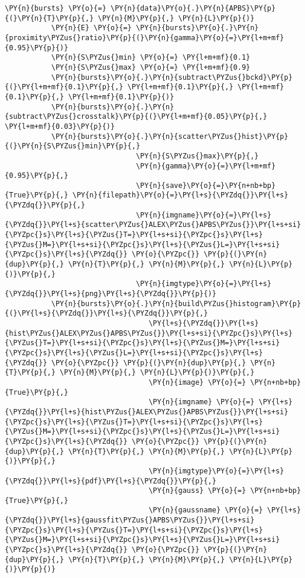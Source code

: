 \begin{Verbatim}[commandchars=\\\{\}, fontsize=\scriptsize]
           \PY{n}{bursts} \PY{o}{=} \PY{n}{data}\PY{o}{.}\PY{n}{APBS}\PY{p}{(}\PY{n}{T}\PY{p}{,} \PY{n}{M}\PY{p}{,} \PY{n}{L}\PY{p}{)}
           \PY{n}{E} \PY{o}{=} \PY{n}{bursts}\PY{o}{.}\PY{n}{proximity\PYZus{}ratio}\PY{p}{(}\PY{n}{gamma}\PY{o}{=}\PY{l+m+mf}{0.95}\PY{p}{)}
           \PY{n}{S\PYZus{}min} \PY{o}{=} \PY{l+m+mf}{0.1}
           \PY{n}{S\PYZus{}max} \PY{o}{=} \PY{l+m+mf}{0.9}
           \PY{n}{bursts}\PY{o}{.}\PY{n}{subtract\PYZus{}bckd}\PY{p}{(}\PY{l+m+mf}{0.1}\PY{p}{,} \PY{l+m+mf}{0.1}\PY{p}{,} \PY{l+m+mf}{0.1}\PY{p}{,} \PY{l+m+mf}{0.1}\PY{p}{)}
           \PY{n}{bursts}\PY{o}{.}\PY{n}{subtract\PYZus{}crosstalk}\PY{p}{(}\PY{l+m+mf}{0.05}\PY{p}{,} \PY{l+m+mf}{0.03}\PY{p}{)}
           \PY{n}{bursts}\PY{o}{.}\PY{n}{scatter\PYZus{}hist}\PY{p}{(}\PY{n}{S\PYZus{}min}\PY{p}{,} 
                               \PY{n}{S\PYZus{}max}\PY{p}{,} 
                               \PY{n}{gamma}\PY{o}{=}\PY{l+m+mf}{0.95}\PY{p}{,} 
                               \PY{n}{save}\PY{o}{=}\PY{n+nb+bp}{True}\PY{p}{,} \PY{n}{filepath}\PY{o}{=}\PY{l+s}{\PYZdq{}}\PY{l+s}{\PYZdq{}}\PY{p}{,} 
                               \PY{n}{imgname}\PY{o}{=}\PY{l+s}{\PYZdq{}}\PY{l+s}{scatter\PYZus{}ALEX\PYZus{}APBS\PYZus{}}\PY{l+s+si}{\PYZpc{}s}\PY{l+s}{\PYZus{}T=}\PY{l+s+si}{\PYZpc{}s}\PY{l+s}{\PYZus{}M=}\PY{l+s+si}{\PYZpc{}s}\PY{l+s}{\PYZus{}L=}\PY{l+s+si}{\PYZpc{}s}\PY{l+s}{\PYZdq{}} \PY{o}{\PYZpc{}} \PY{p}{(}\PY{n}{dup}\PY{p}{,} \PY{n}{T}\PY{p}{,} \PY{n}{M}\PY{p}{,} \PY{n}{L}\PY{p}{)}\PY{p}{,} 
                               \PY{n}{imgtype}\PY{o}{=}\PY{l+s}{\PYZdq{}}\PY{l+s}{png}\PY{l+s}{\PYZdq{}}\PY{p}{)}
           \PY{n}{bursts}\PY{o}{.}\PY{n}{build\PYZus{}histogram}\PY{p}{(}\PY{l+s}{\PYZdq{}}\PY{l+s}{\PYZdq{}}\PY{p}{,} 
                                  \PY{l+s}{\PYZdq{}}\PY{l+s}{hist\PYZus{}ALEX\PYZus{}APBS\PYZus{}}\PY{l+s+si}{\PYZpc{}s}\PY{l+s}{\PYZus{}T=}\PY{l+s+si}{\PYZpc{}s}\PY{l+s}{\PYZus{}M=}\PY{l+s+si}{\PYZpc{}s}\PY{l+s}{\PYZus{}L=}\PY{l+s+si}{\PYZpc{}s}\PY{l+s}{\PYZdq{}} \PY{o}{\PYZpc{}} \PY{p}{(}\PY{n}{dup}\PY{p}{,} \PY{n}{T}\PY{p}{,} \PY{n}{M}\PY{p}{,} \PY{n}{L}\PY{p}{)}\PY{p}{,} 
                                  \PY{n}{image} \PY{o}{=} \PY{n+nb+bp}{True}\PY{p}{,} 
                                  \PY{n}{imgname} \PY{o}{=} \PY{l+s}{\PYZdq{}}\PY{l+s}{hist\PYZus{}ALEX\PYZus{}APBS\PYZus{}}\PY{l+s+si}{\PYZpc{}s}\PY{l+s}{\PYZus{}T=}\PY{l+s+si}{\PYZpc{}s}\PY{l+s}{\PYZus{}M=}\PY{l+s+si}{\PYZpc{}s}\PY{l+s}{\PYZus{}L=}\PY{l+s+si}{\PYZpc{}s}\PY{l+s}{\PYZdq{}} \PY{o}{\PYZpc{}} \PY{p}{(}\PY{n}{dup}\PY{p}{,} \PY{n}{T}\PY{p}{,} \PY{n}{M}\PY{p}{,} \PY{n}{L}\PY{p}{)}\PY{p}{,} 
                                  \PY{n}{imgtype}\PY{o}{=}\PY{l+s}{\PYZdq{}}\PY{l+s}{pdf}\PY{l+s}{\PYZdq{}}\PY{p}{,} 
                                  \PY{n}{gauss} \PY{o}{=} \PY{n+nb+bp}{True}\PY{p}{,} 
                                  \PY{n}{gaussname} \PY{o}{=} \PY{l+s}{\PYZdq{}}\PY{l+s}{gaussfit\PYZus{}APBS\PYZus{}}\PY{l+s+si}{\PYZpc{}s}\PY{l+s}{\PYZus{}T=}\PY{l+s+si}{\PYZpc{}s}\PY{l+s}{\PYZus{}M=}\PY{l+s+si}{\PYZpc{}s}\PY{l+s}{\PYZus{}L=}\PY{l+s+si}{\PYZpc{}s}\PY{l+s}{\PYZdq{}} \PY{o}{\PYZpc{}} \PY{p}{(}\PY{n}{dup}\PY{p}{,} \PY{n}{T}\PY{p}{,} \PY{n}{M}\PY{p}{,} \PY{n}{L}\PY{p}{)}\PY{p}{)}
\end{Verbatim}

